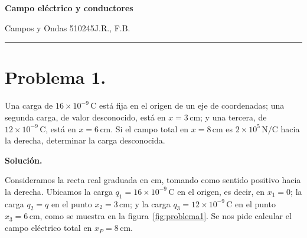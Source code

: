 \documentclass[11pt]{article}
\newcommand{\encabezado}[3]{%
{\Large\bfseries #1\par}
\vspace{2pt}
{\normalsize #2\hfill #3\par}
\vspace{6pt}\hrule\vspace{8pt}}
\newcommand{\soluciontitulo}{%
  \par\medskip
  \noindent\textbf{Solución.}\par
  \smallskip
}
\begin{document}
\encabezado{Campo eléctrico y conductores}{Campos y Ondas 510245}{J.R., F.B.}
\shorthandoff{<>}


\section*{Problema 1.}
Una carga de $16\times 10^{-9}\,\mathrm{C}$ está fija en el origen de un eje de coordenadas; una segunda carga, de valor desconocido, está en $x=3\,\mathrm{cm}$; y una tercera, de $12\times 10^{-9}\,\mathrm{C}$, está en $x=6\,\mathrm{cm}$. Si el campo total en $x=8\,\mathrm{cm}$ es $2\times 10^5\,\mathrm{N/C}$ hacia la derecha, determinar la carga desconocida.

\soluciontitulo

Consideramos la recta real graduada en $\mathrm{cm}$, tomando como sentido positivo hacia la derecha. Ubicamos la carga $q_1=16\times 10^{-9}\,\mathrm{C}$ en el origen, es decir, en $x_1=0$; la carga $q_2=q$ en el punto $x_2=3\,\mathrm{cm}$; y la carga $q_3=12\times 10^{-9}\,\mathrm{C}$ en el punto $x_3=6\,\mathrm{cm}$, como se muestra en la figura~\ref{fig:problema1}. Se nos pide calcular el campo eléctrico total en $x_P=8\,\mathrm{cm}$.
\end{document}
